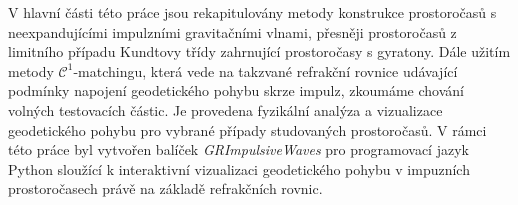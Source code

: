 \documentclass[12pt]{report}
\begin{document}

V hlavní části této práce jsou rekapitulovány metody konstrukce prostoročasů
s neexpandujícími impulzními gravitačními vlnami, přesněji prostoročasů z limitního případu Kundtovy třídy zahrnující
prostoročasy s gyratony. Dále užitím metody $\mathcal{C}^1$-matchingu, která vede na takzvané refrakční rovnice
udávající podmínky napojení geodetického pohybu skrze impulz, zkoumáme chování volných testovacích částic.
Je provedena fyzikální analýza a vizualizace geodetického
pohybu pro vybrané případy studovaných prostoročasů.
V rámci této práce byl vytvořen balíček \emph{GRImpulsiveWaves} pro programovací jazyk Python sloužící k
interaktivní vizualizaci geodetického pohybu v impuzních prostoročasech právě na základě refrakčních rovnic.
\end{document}
